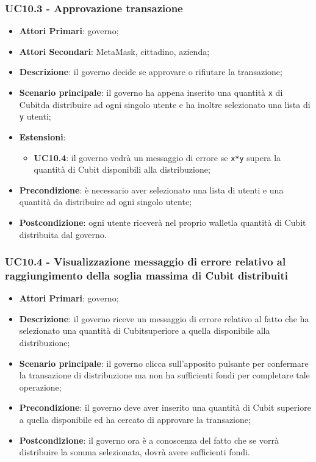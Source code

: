 \subsubsection{UC10.3 - Approvazione transazione}
\begin{itemize}
	\item \textbf{Attori Primari}: governo;
	\item \textbf{Attori Secondari}: MetaMask\glo, cittadino, azienda\glo;
	\item \textbf{Descrizione}: il governo decide se approvare o rifiutare la transazione;
	\item \textbf{Scenario principale}: il governo ha appena inserito una quantità \texttt{x} di Cubit\glosp da distribuire ad ogni singolo utente e ha inoltre selezionato una lista di \texttt{y} utenti;
	\item \textbf{Estensioni}:
	\begin{itemize}
		\item \textbf{UC10.4}: il governo vedrà un messaggio di errore se \texttt{x*y} supera la quantità di Cubit disponibili alla distribuzione;
	\end{itemize}
	\item \textbf{Precondizione}: è necessario aver selezionato una lista di utenti e una quantità da distribuire ad ogni singolo utente;
	\item \textbf{Postcondizione}: ogni utente riceverà nel proprio wallet\glosp la quantità di Cubit distribuita dal governo.
\end{itemize}
\subsubsection{UC10.4 - Visualizzazione messaggio di errore relativo al raggiungimento della soglia massima di Cubit distribuiti}
\begin{itemize}
	\item \textbf{Attori Primari}: governo;
	\item \textbf{Descrizione}: il governo riceve un messaggio di errore relativo al fatto che ha selezionato una quantità di Cubit\glosp superiore a quella disponibile alla distribuzione;
	\item \textbf{Scenario principale}: il governo clicca sull'apposito pulsante per confermare la transazione di distribuzione ma non ha sufficienti fondi per completare tale operazione;
	\item \textbf{Precondizione}: il governo deve aver inserito una quantità di Cubit superiore a quella disponibile ed ha cercato di approvare la transazione;
	\item \textbf{Postcondizione}: il governo ora è a conoscenza del fatto che se vorrà distribuire la somma selezionata, dovrà avere sufficienti fondi.
	
\end{itemize} 

